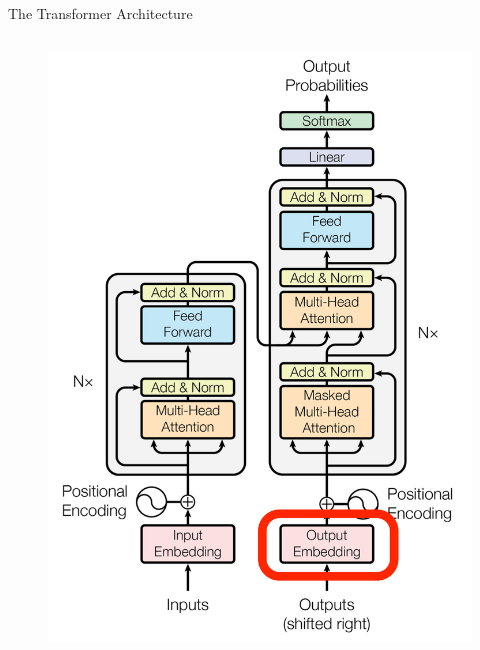 \documentclass[aspectratio=169]{beamer}
\begin{document}
\begin{frame}{The Transformer Architecture}
\begin{columns}
\begin{column}{0.5\textwidth}
\begin{center}
\begin{figure}
\begin{overprint}
	 \includegraphics[height=\paperheight]{figures/transformer_out_embed}
    \end{overprint}
    \end{figure}
    \end{center}
\end{column}
\end{columns}
\end{frame}

\end{document}
